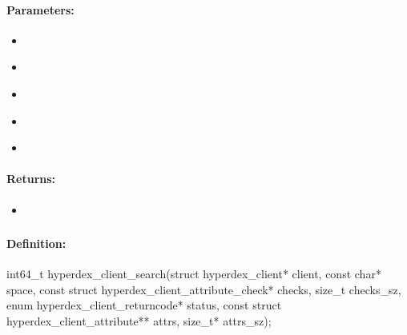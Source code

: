 \paragraph{Parameters:}
\begin{itemize}[noitemsep]
\item {}\\

\item {}\\

\item {}\\

\item {}\\

\item {}\\

\end{itemize}

\paragraph{Returns:}
\begin{itemize}[noitemsep]
\item {}\\

\end{itemize}

\pagebreak
\subsubsection{}
\label{api:c:search}


\paragraph{Definition:}
\begin{ccode}
int64_t hyperdex_client_search(struct hyperdex_client* client,
        const char* space,
        const struct hyperdex_client_attribute_check* checks, size_t checks_sz,
        enum hyperdex_client_returncode* status,
        const struct hyperdex_client_attribute** attrs, size_t* attrs_sz);
\end{ccode}

